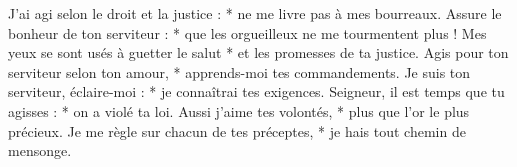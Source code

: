 J’ai agi selon le droit et la justice : *
ne me livre pas à mes bourreaux.
\versseparator
Assure le bonheur de ton serviteur : *
que les orgueilleux ne me tourmentent plus !
\versseparator
Mes yeux se sont usés à guetter le salut *
et les promesses de ta justice.
\versseparator
Agis pour ton serviteur selon ton amour, *
apprends-moi tes commandements.
\versseparator
Je suis ton serviteur, éclaire-moi : *
je connaîtrai tes exigences.
\versseparator
Seigneur, il est temps que tu agisses : *
on a violé ta loi.
\versseparator
Aussi j’aime tes volontés, *
plus que l’or le plus précieux.
\versseparator
Je me règle sur chacun de tes préceptes, *
je hais tout chemin de mensonge.
